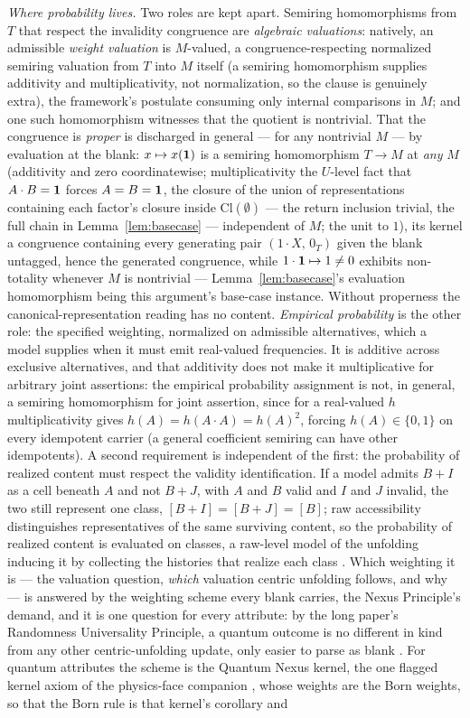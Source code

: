 \textit{Where probability lives.} Two roles are kept apart. Semiring homomorphisms from $T$ that respect the invalidity congruence are \emph{algebraic valuations}: natively, an admissible \emph{weight valuation} is $M$-valued, a congruence-respecting normalized semiring valuation from $T$ into $M$ itself (a semiring homomorphism supplies additivity and multiplicativity, not normalization, so the clause is genuinely extra), the framework's postulate consuming only internal comparisons in $M$; and one such homomorphism witnesses that the quotient is nontrivial. That the congruence is \emph{proper} is discharged in general --- for any nontrivial $M$ --- by evaluation at the blank: $x \mapsto x(\mathbf{1})$ is a semiring homomorphism $T \to M$ at \emph{any} $M$ (additivity and zero coordinatewise; multiplicativity the $U$-level fact that $A \cdot B = \mathbf{1}$ forces $A = B = \mathbf{1}$, the closure of the union of representations containing each factor's closure inside $\mathrm{Cl}(\emptyset)$ --- the return inclusion trivial, the full chain in Lemma~\ref{lem:basecase} --- independent of $M$; the unit to $1$), its kernel a congruence containing every generating pair $(1 \cdot X,\, 0_T)$ given the blank untagged, hence the generated congruence, while $1 \cdot \mathbf{1} \mapsto 1 \neq 0$ exhibits non-totality whenever $M$ is nontrivial --- Lemma~\ref{lem:basecase}'s evaluation homomorphism being this argument's base-case instance. Without properness the canonical-representation reading has no content. \emph{Empirical probability} is the other role: the specified weighting, normalized on admissible alternatives, which a model supplies when it must emit real-valued frequencies. It is additive across exclusive alternatives, and that additivity does not make it multiplicative for arbitrary joint assertions: the empirical probability assignment is not, in general, a semiring homomorphism for joint assertion, since for a real-valued $h$ multiplicativity gives $h(A) = h(A \cdot A) = h(A)^2$, forcing $h(A) \in \{0, 1\}$ on every idempotent carrier (a general coefficient semiring can have other idempotents). A second requirement is independent of the first: the probability of realized content must respect the validity identification. If a model admits $B + I$ as a cell beneath $A$ and not $B + J$, with $A$ and $B$ valid and $I$ and $J$ invalid, the two still represent one class, $[B + I] = [B + J] = [B]$; raw accessibility distinguishes representatives of the same surviving content, so the probability of realized content is evaluated on classes, a raw-level model of the unfolding inducing it by collecting the histories that realize each class \cite{Aethus}. Which weighting it is --- the valuation question, \emph{which} valuation centric unfolding follows, and why --- is answered by the weighting scheme every blank carries, the Nexus Principle's demand, and it is one question for every attribute: by the long paper's Randomness Universality Principle, a quantum outcome is no different in kind from any other centric-unfolding update, only easier to parse as blank \cite{Aethus}. For quantum attributes the scheme is the Quantum Nexus kernel, the one flagged kernel axiom of the physics-face companion \cite{AethusQuant}, whose weights are the Born weights, so that the Born rule is that kernel's corollary and 
